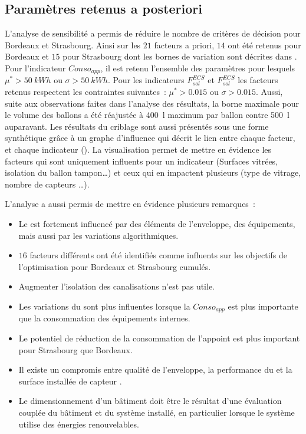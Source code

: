 \subsection{Paramètres retenus a posteriori} %
\label{sub:parametres_retenus_a_posteriori}
L’analyse de sensibilité a permis de réduire le nombre de critères de décision
pour Bordeaux et Strasbourg. Ainsi sur les $21$ facteurs a priori, $14$ ont été retenus
pour Bordeaux et $15$ pour Strasbourg dont les bornes de variation sont décrites
dans . Pour l’indicateur $Conso_{app}$, il est retenu
l’ensemble des paramètres pour lesquels $\mu^{*} > \SI{50}{kWh}$ ou $\sigma > \SI{50}{kWh}$. Pour
les indicateurs $F_{sol}^{ECS}$ et $F_{sol}^{ECS}$ les facteurs retenus respectent
les contraintes suivantes~: $\mu^{*} > 0.015$ ou $\sigma > 0.015$.
Aussi, suite aux observations faites dans l’analyse des résultats, la borne maximale pour le volume des
ballons a été réajustée à \SI{400}{\litre} maximum par ballon contre \SI{500}{\litre}
auparavant.
Les résultats du criblage sont aussi présentés sous une forme synthétique grâce à un
graphe d’influence qui décrit le lien entre chaque facteur, et chaque indicateur
(). La visualisation permet de mettre en évidence
les facteurs qui sont uniquement influents pour un indicateur (Surfaces vitrées, isolation du ballon tampon\dots) et
ceux qui en impactent plusieurs (type de vitrage, nombre de capteurs \dots).

L’analyse a aussi permis de mettre en évidence plusieurs remarques~:
\begin{itemize}
  \item Le  est fortement influencé par des éléments de l’enveloppe, des équipements,
        mais aussi par les variations algorithmiques.
  \item $16$ facteurs différents ont été identifiés comme influents sur les objectifs de
        l’optimisation pour Bordeaux et Strasbourg cumulés.
  \item Augmenter l’isolation des canalisations n’est pas utile.
  \item Les variations du  sont plus influentes lorsque la $Conso_{app}$
        est plus importante que la consommation des équipements internes.
  \item Le potentiel de réduction de la consommation de l’appoint est plus important
        pour Strasbourg que Bordeaux.
  \item Il existe un compromis entre qualité de l’enveloppe, la performance du 
        et la surface installée de capteur .
  \item Le dimensionnement d’un bâtiment doit être le résultat d’une évaluation
        couplée du bâtiment et du système installé, en particulier lorsque le système
        utilise des énergies renouvelables.
\end{itemize}

